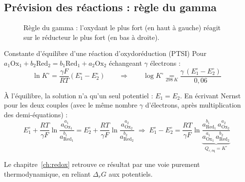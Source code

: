 \subsection{Prévision des réactions : règle du gamma}

\begin{figure}[H]
\centering
{}
\caption{Règle du gamma : l'oxydant le plus fort (en haut à gauche) réagit sur le réducteur le plus fort (en bas à droite).}
\label{fig:gamma}
\end{figure}

\begin{resultat}{Constante d'équilibre d'une réaction d'oxydoréduction (PTSI)}
Pour $a_1\mathrm{Ox}_1 + b_2\mathrm{Red}_2 = b_1\mathrm{Red}_1 + a_2\mathrm{Ox}_2$ échangeant $\gamma$ électrons :
\[ \ln K^\circ = \frac{\gamma F}{RT}\left(E_1^\circ - E_2^\circ\right) \qquad\Longrightarrow\qquad \boxed{\log K^\circ \underset{\SI{298}{K}}{=} \frac{\gamma\,(E_1^\circ - E_2^\circ)}{0{,}06}} \]
\end{resultat}

\begin{demo}
À l'équilibre, la solution n'a qu'un seul potentiel : $E_1 = E_2$. En écrivant Nernst pour les deux couples (avec le même nombre $\gamma$ d'électrons, après multiplication des demi-équations) :
\[ E_1^\circ + \frac{RT}{\gamma F}\ln\frac{a_{\mathrm{Ox}_1}^{a_1}}{a_{\mathrm{Red}_1}^{b_1}} = E_2^\circ + \frac{RT}{\gamma F}\ln\frac{a_{\mathrm{Ox}_2}^{a_2}}{a_{\mathrm{Red}_2}^{b_2}} \;\Longrightarrow\; E_1^\circ - E_2^\circ = \frac{RT}{\gamma F}\ln\underbrace{\frac{a_{\mathrm{Red}_1}^{b_1}\,a_{\mathrm{Ox}_2}^{a_2}}{a_{\mathrm{Ox}_1}^{a_1}\,a_{\mathrm{Red}_2}^{b_2}}}_{Q_{r,\text{éq}} = K^\circ} \]
\end{demo}

Le chapitre~\ref{ch:redox} retrouve ce résultat par une voie purement thermodynamique, en reliant $\Delta_rG$ aux potentiels.
